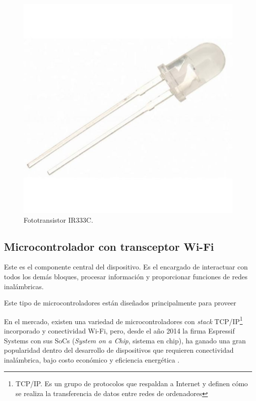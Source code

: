 	\begin{figure}[h]
		\centering
		\includegraphics[scale=0.3]{./Figures/phototransistor.jpg}
		\caption{Fototransistor IR333C.}
		\label{fig:cuadradoAzul}
	\end{figure}

\subsection{Microcontrolador con transceptor Wi-Fi}

Este es el componente central del dispositivo. Es el encargado de interactuar con todos los demás bloques, procesar información y proporcionar funciones de redes inalámbricas.

Este tipo de microcontroladores están diseñados principalmente para proveer 

En el mercado, existen una variedad de microcontroladores con \textit{stack} TCP/IP\footnote{TCP/IP. Es un grupo de protocolos  que respaldan a Internet y definen cómo se realiza la transferencia de datos entre redes de ordenadores} incorporado y conectividad Wi-Fi, pero, desde el año 2014 la firma Espressif Systems con sus SoCs (\textit{System on a Chip}, sistema en chip), ha ganado una gran popularidad dentro del desarrollo de dispositivos que requieren conectividad inalámbrica, bajo costo económico y eficiencia energética \citep{WEBSITE:9}.


